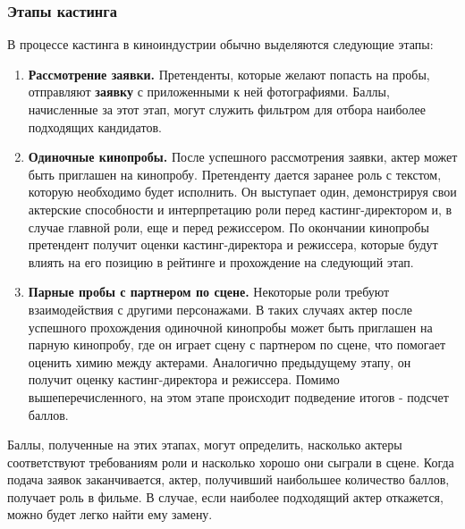 \documentclass[11pt,a4paper,final]{article} %
\begin{document}
\subsubsection{Этапы кастинга}
В процессе кастинга в киноиндустрии обычно выделяются следующие этапы:

\begin{enumerate}
	\item \textbf{Рассмотрение заявки.} Претенденты, которые желают попасть на пробы, отправляют \textbf{заявку} с приложенными к ней фотографиями. Баллы, начисленные за этот этап, могут служить фильтром для отбора наиболее подходящих кандидатов. 
	
	\item \textbf{Одиночные кинопробы.} После успешного рассмотрения заявки, актер может быть приглашен на кинопробу. Претенденту дается заранее роль с текстом, которую необходимо будет исполнить. Он выступает один, демонстрируя свои актерские способности и интерпретацию роли перед кастинг-директором и, в случае главной роли, еще и перед режиссером. 
	По окончании кинопробы претендент получит оценки кастинг-директора и режиссера, которые будут влиять на его позицию в рейтинге и прохождение на следующий этап.
	
	\item \textbf{Парные пробы с партнером по сцене.} Некоторые роли требуют взаимодействия с другими персонажами. В таких случаях актер после успешного прохождения одиночной кинопробы может быть приглашен на парную кинопробу, где он играет сцену с партнером по сцене, что помогает оценить химию между актерами. Аналогично предыдущему этапу, он получит оценку кастинг-директора и режиссера. Помимо вышеперечисленного, на этом этапе происходит подведение итогов - подсчет баллов.  
	
	
\end{enumerate}

\par Баллы, полученные на этих этапах, могут определить, насколько актеры соответствуют требованиям роли и насколько хорошо они сыграли в сцене. Когда подача заявок заканчивается, актер, получивший наибольшее количество баллов, получает роль в фильме. В случае, если наиболее подходящий актер откажется, можно будет легко найти ему замену.  


\newpage
\end{document}
